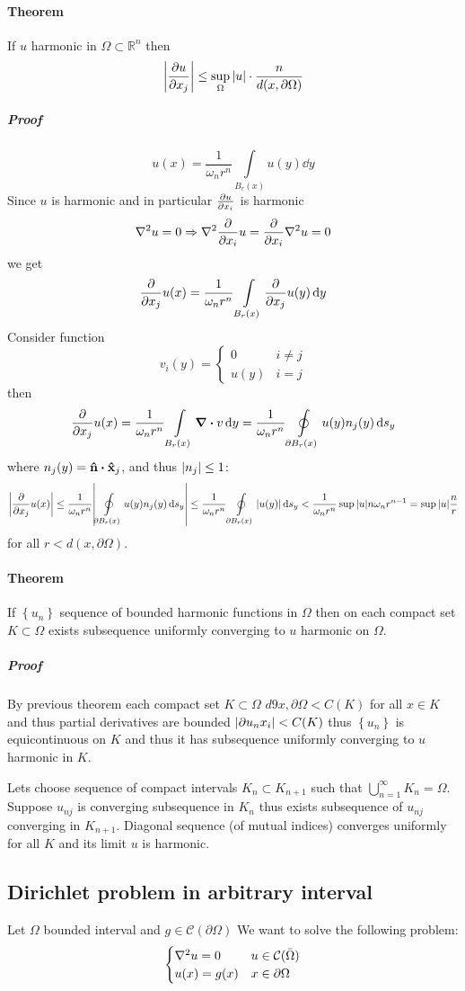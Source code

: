 \paragraph{Theorem} If $u$ harmonic in $\Omega \subset \mathbb{R}^n$ then
$$\abs{\pdv{u}{x_j} (x)} \leq \sup\limits_{\Omega} \abs{u} \cdot \frac{n}{d(x, \partial \Omega)}$$
\subparagraph{Proof}
$$u(x) = \frac{1}{\omega_n r^n} \int\limits_{B_r(x)} u(y) \dd{y}$$
Since $u$ is harmonic and in particular $\pdv{u}{x_i}$ is harmonic
$$\laplacian{u} = 0 \Rightarrow \laplacian{\pdv{x_i} u} = \pdv{x_i} \laplacian{u} = 0$$
we get
$$\pdv{x_j} u(x) =  \frac{1}{\omega_n r^n} \int\limits_{B_r(x)} \pdv{x_j} u(y) \dd{y}$$
Consider function
$$v_i(y) = \begin{cases}
0 & i\neq j\\
u(y) & i=j
\end{cases}$$
then
$$\pdv{x_j} u(x) =  \frac{1}{\omega_n r^n} \int\limits_{B_r(x)} \div{v} \dd{y} =  \frac{1}{\omega_n r^n} \oint\limits_{ \partial B_r(x)} u(y) n_j(y) \dd{s_y}$$
where $n_j(y) = \vu{n} \vdot \vu{x}_j$, and thus $\abs{n_j} \leq 1$:
$$\abs{\pdv{x_j} u(x) } \leq \frac{1}{\omega_n r^n} \abs{\oint\limits_{ \partial B_r(x)} u(y) n_j(y) \dd{s_y}} \leq \frac{1}{\omega_n r^n} \oint\limits_{ \partial B_r(x)} \abs{u(y)}  \dd{s_y} < \frac{1}{\omega_n r^n} \sup \abs{u} n\omega_n r^{n-1} = \sup \abs{u} \frac{n}{r}$$
for all $r< d(x, \partial \Omega)$.
\paragraph{Theorem}
If $\left\{ u_n \right\}$ sequence of bounded harmonic functions in $\Omega$ then on each compact set $K\subset \Omega$ exists subsequence  uniformly converging to $u$ harmonic on $\Omega$.
\subparagraph{Proof} By previous theorem each compact set $K\subset \Omega$ $d9x, \partial \Omega < C(K)$ for all $x\in K$ and thus partial derivatives are bounded $\abs{\partial{u_n}{x_i}} < C(K)$ thus $\left\{u_n\right\}$ is equicontinuous on $K$ and thus it has subsequence  uniformly converging to $u$ harmonic in $K$.

Lets choose sequence of compact intervals $K_n \subset K_{n+1}$ such that $\bigcup_{n=1}^\infty K_n = \Omega$. Suppose $u_{nj}$ is converging subsequence in $K_n$ thus exists subsequence of $u_{nj}$ converging in $K_{n+1}$. Diagonal sequence (of mutual indices) converges uniformly for all $K$ and its limit $u$ is harmonic.
\subsection{Dirichlet problem in arbitrary interval}
Let $\Omega$ bounded interval and $g\in \mathcal{C}(\partial \Omega)$ We want to solve the following problem:
$$\begin{cases}
\laplacian{u} = 0 & u \in \mathcal{C}(\bar{\Omega})\\
u(x) = g(x) & x \in \partial \Omega
\end{cases}$$
